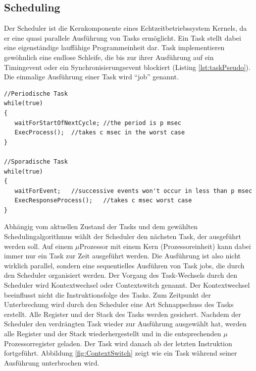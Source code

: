 \subsection{Scheduling}
\label{Scheduling}
Der Scheduler ist die Kernkomponente eines Echtzeitbetriebssystem Kernels, da er eine quasi parallele Aus\-füh\-rung von Tasks ermöglicht. Ein Task stellt dabei eine ei\-gen\-stän\-di\-ge lauffähige Programmeinheit dar. Task implementieren gewöhnlich eine endlose Schleife, die bis zur ihrer Ausführung auf ein Timingevent oder ein Synchronisierungsevent blockiert (Listing \ref{lst:taskPseudo}). Die einmalige Aus\-füh\-rung einer Task wird "`job"'\cite{9780128015070} genannt. 
\begin{lstlisting}[caption={Pseudocode für die Implementierungsmuster einer periodischen (zeitgesteuert) Task und sporadischen (eventgesteuert) Task ~\protect\citeA{LorenK.Rhodes2017}}, linewidth=8cm,captionpos=b, label=lst:taskPseudo, float=hbt]
//Periodische Task
while(true)
{
   waitForStartOfNextCycle; //the period is p msec
   ExecProcess();  //takes c msec in the worst case
}

//Sporadische Task
while(true)
{
   waitForEvent;   //successive events won't occur in less than p msec
   ExecResponseProcess();   //takes c msec worst case
}
\end{lstlisting}
Abhängig vom aktuellen Zustand der Tasks und dem gewählten Scheduling\-algorithmus wählt der Scheduler den nächsten Task, der ausgeführt werden soll. Auf einem $\mu$\-Pro\-zesso\-r mit einem Kern (Prozessoreinheit) kann dabei immer nur ein Task zur Zeit ausgeführt werden. Die Ausführung ist also nicht wirklich parallel, sondern eine sequentielles Ausführen von Task jobs, die durch den Scheduler organisiert werden. Der Vorgang des Task-Wechsels durch den Scheduler wird Kontextwechsel oder Contextswitch genannt. Der Kontextwechsel beeinflusst nicht die Instruktionsfolge des Tasks. Zum Zeitpunkt der Unterbrechung wird durch den Scheduler eine Art Schnappschuss des Tasks erstellt. Alle Register und der Stack des Tasks werden gesichert. Nachdem der Scheduler den verdrängten Task wieder zur Aus\-füh\-rung ausgewählt hat, werden alle Register und der Stack wiederhergestellt und in die entsprechenden $\mu$\-Pro\-zes\-sor\-re\-gis\-ter geladen. Der Task wird danach ab der letzten Instruktion fortgeführt. Abbildung \ref{fig:ContextSwitch} zeigt wie ein Task während seiner Ausführung unterbrochen wird.
